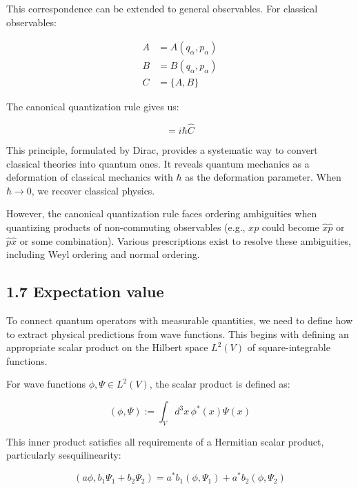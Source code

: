 \documentclass[italian]{HKNdocument}
\begin{document}
This correspondence can be extended to general observables. For classical observables:

\begin{align*}
A &= A(q_\alpha, p_\alpha) \\
B &= B(q_\alpha, p_\alpha) \tag{1.76} \\
C &= \{A, B\}
\end{align*}

The canonical quantization rule gives us:

\begin{equation*}
[\hat{A}, \hat{B}] = i\hbar\hat{C} \tag{1.77}
\end{equation*}

This principle, formulated by Dirac, provides a systematic way to convert classical theories into quantum ones. It reveals quantum mechanics as a deformation of classical mechanics with $\hbar$ as the deformation parameter. When $\hbar \to 0$, we recover classical physics.

However, the canonical quantization rule faces ordering ambiguities when quantizing products of non-commuting observables (e.g., $xp$ could become $\hat{x}\hat{p}$ or $\hat{p}\hat{x}$ or some combination). Various prescriptions exist to resolve these ambiguities, including Weyl ordering and normal ordering.

\subsection*{1.7 Expectation value}

To connect quantum operators with measurable quantities, we need to define how to extract physical predictions from wave functions. This begins with defining an appropriate scalar product on the Hilbert space $L^2(V)$ of square-integrable functions.


For wave functions $\phi, \Psi \in L^2(V)$, the scalar product is defined as:

\begin{equation*}
(\phi, \Psi) := \int_V d^3x \, \phi^*(x) \Psi(x) \tag{1.78}
\end{equation*}

This inner product satisfies all requirements of a Hermitian scalar product, particularly sesquilinearity:

\begin{equation*}
(a\phi, b_1\Psi_1 + b_2\Psi_2) = a^*b_1(\phi, \Psi_1) + a^*b_2(\phi, \Psi_2) \tag{1.79}
\end{equation*}
\end{document}
